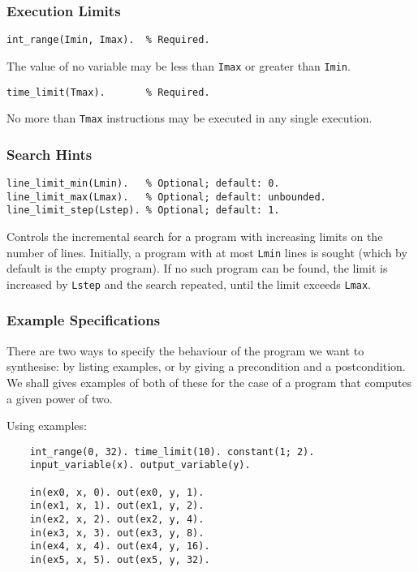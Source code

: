 \documentclass[a4paper,twoside,notitlepage]{article}
\newcommand{\ttt}{\texttt}
\begin{document}
\subsubsection{Execution Limits}
\begin{verbatim}
int_range(Imin, Imax).  % Required.
\end{verbatim}
The value of no variable may be less than \ttt{Imax} or greater than 
\ttt{Imin}.

\begin{verbatim}
time_limit(Tmax).       % Required.
\end{verbatim}
No more than \ttt{Tmax} instructions may be executed in any single execution.

\subsubsection{Search Hints}
\begin{verbatim}
line_limit_min(Lmin).   % Optional; default: 0.
line_limit_max(Lmax).   % Optional; default: unbounded.
line_limit_step(Lstep). % Optional; default: 1.
\end{verbatim}
Controls the incremental search for a program with increasing limits on the 
number of lines. Initially, a program with at most \ttt{Lmin} lines is sought 
(which by default is the empty program). If no such program can be found, the 
limit is increased by \ttt{Lstep} and the search repeated, until the limit 
exceeds \ttt{Lmax}.

\subsubsection{Example Specifications}

There are two ways to specify the behaviour of the program we want to 
synthesise: by listing examples, or by giving a precondition and a 
postcondition. We shall gives examples of both of these for the case of a 
program that computes a given power of two.

Using examples:
\begin{verbatim}
    int_range(0, 32). time_limit(10). constant(1; 2).
    input_variable(x). output_variable(y).

    in(ex0, x, 0). out(ex0, y, 1).
    in(ex1, x, 1). out(ex1, y, 2).
    in(ex2, x, 2). out(ex2, y, 4).
    in(ex3, x, 3). out(ex3, y, 8).
    in(ex4, x, 4). out(ex4, y, 16).
    in(ex5, x, 5). out(ex5, y, 32).
\end{verbatim}
\end{document}
